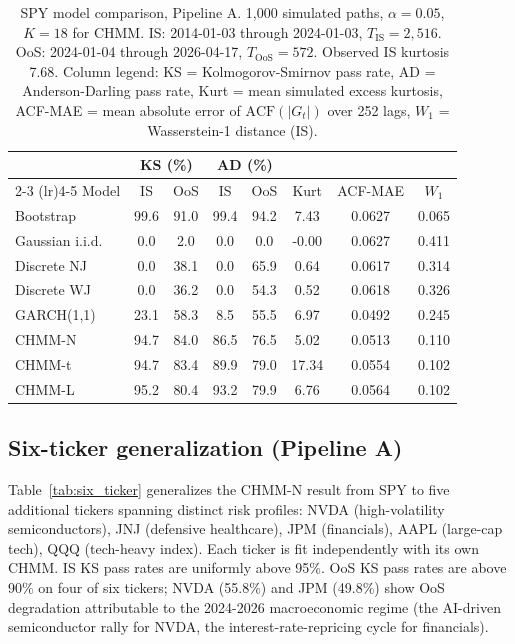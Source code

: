 \documentclass[sigconf,anonymous,nonacm=true]{acmart}
\begin{document}
\begin{table}[t]
\centering
\small
\caption{SPY model comparison, Pipeline A. 1{,}000 simulated paths,
$\alpha = 0.05$, $K = 18$ for CHMM. IS: 2014-01-03 through 2024-01-03,
$T_{\text{IS}} = 2{,}516$. OoS: 2024-01-04 through 2026-04-17,
$T_{\text{OoS}} = 572$. Observed IS kurtosis 7.68. Column legend:
KS = Kolmogorov-Smirnov pass rate, AD = Anderson-Darling pass rate,
Kurt = mean simulated excess kurtosis,
ACF-MAE = mean absolute error of $\text{ACF}(|G_t|)$ over 252 lags,
$W_1$ = Wasserstein-1 distance (IS).}
\label{tab:spy_comparison}
\begin{tabular}{l cc cc c c c}
\toprule
 & \multicolumn{2}{c}{KS (\%)} & \multicolumn{2}{c}{AD (\%)} & & & \\
\cmidrule(lr){2-3} \cmidrule(lr){4-5}
Model & IS & OoS & IS & OoS & Kurt & ACF-MAE & $W_1$ \\
\midrule
Bootstrap         & 99.6 & 91.0 & 99.4 & 94.2 & 7.43  & 0.0627 & 0.065 \\
Gaussian i.i.d.   & 0.0  & 2.0  & 0.0  & 0.0  & -0.00 & 0.0627 & 0.411 \\
Discrete NJ       & 0.0  & 38.1 & 0.0  & 65.9 & 0.64  & 0.0617 & 0.314 \\
Discrete WJ       & 0.0  & 36.2 & 0.0  & 54.3 & 0.52  & 0.0618 & 0.326 \\
GARCH(1,1)        & 23.1 & 58.3 & 8.5  & 55.5 & 6.97  & 0.0492 & 0.245 \\
CHMM-N            & 94.7 & 84.0 & 86.5 & 76.5 & 5.02  & 0.0513 & 0.110 \\
CHMM-t            & 94.7 & 83.4 & 89.9 & 79.0 & 17.34 & 0.0554 & 0.102 \\
CHMM-L            & 95.2 & 80.4 & 93.2 & 79.9 & 6.76  & 0.0564 & 0.102 \\
\bottomrule
\end{tabular}
\end{table}

\subsection{Six-ticker generalization (Pipeline A)}

Table~\ref{tab:six_ticker} generalizes the CHMM-N result from SPY to
five additional tickers spanning distinct risk profiles: NVDA
(high-volatility semiconductors), JNJ (defensive healthcare), JPM
(financials), AAPL (large-cap tech), QQQ (tech-heavy index). Each
ticker is fit independently with its own CHMM. IS KS pass rates are
uniformly above 95\%. OoS KS pass rates are above 90\% on four of six
tickers; NVDA (55.8\%) and JPM (49.8\%) show OoS degradation
attributable to the 2024-2026 macroeconomic regime (the AI-driven
semiconductor rally for NVDA, the interest-rate-repricing cycle for
financials).
\end{document}
